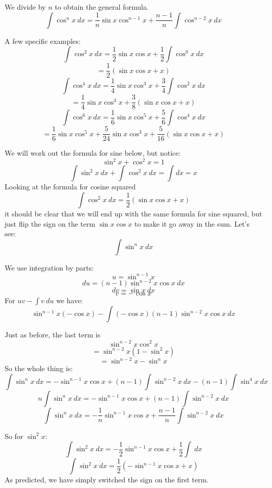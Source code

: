 \documentclass[11pt, oneside]{article}
\begin{document}
We divide by $n$ to obtain the general formula.  
\[ \boxed{\int \cos^n x \ dx =   \frac{1}{n} \sin x \cos^{n-1} x +  \frac{n-1}{n} \int \cos^{n-2} x \ dx} \]

A few specific examples:
\[ \int \cos^2 x \ dx =   \frac{1}{2} \sin x \cos x +  \frac{1}{2} \int \cos^{0} x \ dx \]
\[ = \frac{1}{2}(\sin x \cos x + x)  \]
\[ \int \cos^4 x \ dx =   \frac{1}{4} \sin x \cos^3 x +  \frac{3}{4} \int \cos^{2} x \ dx \]
\[ = \frac{1}{4} \sin x \cos^3 x +  \frac{3}{8} (\sin x \cos x + x)  \]
\[ \int \cos^6 x \ dx =   \frac{1}{6} \sin x \cos^5 x +  \frac{5}{6} \int \cos^{4} x \ dx \]
\[ = \frac{1}{6} \sin x \cos^5 x +  \frac{5}{24} \sin x \cos^3 x +  \frac{5}{16} (\sin x \cos x + x)  \]

We will work out the formula for sine below, but notice:
\[ \sin^2 x + \cos^2 x = 1 \]
\[ \int \sin^2 x \ dx + \int \cos^2 x \ dx = \int dx = x \]
Looking at the formula for cosine squared
\[ \int \cos^2 x \ dx = \frac{1}{2}(\sin x \cos x + x)  \]
it should be clear that we will end up with the same formula for sine squared, but just flip the sign on the term $\sin x \cos x$ to make it go away in the sum.  Let's see:
\[ \int \sin^n x \ dx \]

We use integration by parts:
\[ u = \sin^{n-1} x \]
\[ du = (n-1)\sin^{n-2} x \cos x \ dx \]
\[ dv = \sin x \ dx \]
\[ v = -\cos x \]
For $uv - \int v \ du$ we have:
\[ \sin^{n-1} x (- \cos x) - \int (- \cos x) (n-1)\sin^{n-2} x \cos x \ dx \]

Just as before, the last term is
\[ \sin^{n-2} x \cos^2 x \]
\[ = \sin^{n-2} x (1 - \sin^2 x) \]
\[ = \sin^{n-2} x - \sin^n x \]
So the whole thing is:
\[ \int \sin^n x \ dx = -\sin^{n-1} x \cos x + (n-1) \int \sin^{n-2} x \ dx - (n-1) \int \sin^4 x \ dx \]
\[ n \int \sin^n x \ dx = -\sin^{n-1} x \cos x + (n-1) \int \sin^{n-2} x \ dx  \]
\[ \boxed{\int \sin^n x \ dx = - \frac{1}{n} \sin^{n-1} x \cos x + \frac{n-1}{n} \int \sin^{n-2} x \ dx}  \]

So for $\sin^2 x$:
\[ \int \sin^2 x \ dx = - \frac{1}{2} \sin^{n-1} x \cos x + \frac{1}{2} \int \ dx  \]
\[ \int \sin^2 x \ dx = \frac{1}{2} (- \sin^{n-1} x \cos x + x)  \]
As predicted, we have simply switched the sign on the first term.
\end{document}
